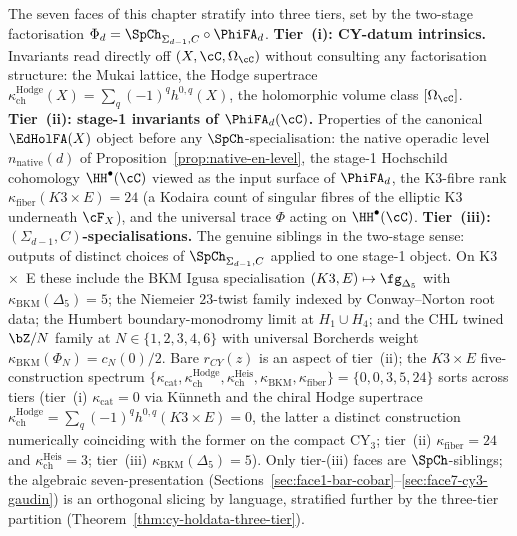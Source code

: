 \begin{remark}
\label{rem:cy-seven-face-three-tier-opener}
The seven faces of this chapter stratify into three tiers, set by the
two-stage factorisation $\Phi_d = \SpCh_{\Sigma_{d-1}, C} \circ \PhiFA_d$.
\textbf{Tier~(i): CY-datum intrinsics.} Invariants read directly off
$(X, \cC, \Omega_\cC)$ without consulting any factorisation structure:
the Mukai lattice, the Hodge supertrace $\kappa_{\mathrm{ch}}^{\mathrm{Hodge}}(X)
= \sum_q (-1)^q h^{0,q}(X)$, the holomorphic volume class $[\Omega_\cC]$.
\textbf{Tier~(ii): stage-1 invariants of $\PhiFA_d(\cC)$.} Properties of the
canonical $\EdHolFA(X)$ object before any $\SpCh$-specialisation: the
native operadic level $n_{\mathrm{native}}(d)$ of Proposition~\ref{prop:native-en-level},
the stage-1 Hochschild cohomology $\HH^\bullet(\cC)$ viewed as the input
surface of $\PhiFA_d$, the K3-fibre rank $\kappa_{\mathrm{fiber}}(K3 \times E) = 24$
(a Kodaira count of singular fibres of the elliptic K3 underneath $\cF_X$),
and the universal trace $\Phi$ acting on $\HH^\bullet(\cC)$.
\textbf{Tier~(iii): $(\Sigma_{d-1}, C)$-specialisations.} The genuine siblings
in the two-stage sense: outputs of distinct choices of $\SpCh_{\Sigma_{d-1}, C}$
applied to one stage-1 object. On K3~$\times$~E these include the BKM Igusa
specialisation $(K3, E) \mapsto \fg_{\Delta_5}$ with
$\kappa_{\mathrm{BKM}}(\Delta_5) = 5$; the Niemeier $23$-twist family indexed by
Conway--Norton root data; the Humbert boundary-monodromy limit at
$H_1 \cup H_4$; and the CHL twined $\bZ/N$ family at $N \in \{1,2,3,4,6\}$
with universal Borcherds weight $\kappa_{\mathrm{BKM}}(\Phi_N) = c_N(0)/2$.
Bare $r_{CY}(z)$ is an aspect of tier~(ii); the $K3 \times E$ five-construction spectrum
$\{\kappa_{\mathrm{cat}}, \kappa_{\mathrm{ch}}^{\mathrm{Hodge}},
\kappa_{\mathrm{ch}}^{\mathrm{Heis}}, \kappa_{\mathrm{BKM}},
\kappa_{\mathrm{fiber}}\} = \{0, 0, 3, 5, 24\}$ sorts across tiers
(tier~(i) $\kappa_{\mathrm{cat}} = 0$ via K\"unneth and the chiral
Hodge supertrace
$\kappa_{\mathrm{ch}}^{\mathrm{Hodge}} = \sum_q (-1)^q h^{0,q}(K3 \times E) = 0$,
the latter a distinct construction numerically coinciding with the
former on the compact CY$_3$; tier~(ii) $\kappa_{\mathrm{fiber}} = 24$
and $\kappa_{\mathrm{ch}}^{\mathrm{Heis}} = 3$; tier~(iii)
$\kappa_{\mathrm{BKM}}(\Delta_5) = 5$). Only tier-(iii) faces are
$\SpCh$-siblings; the algebraic seven-presentation
(Sections~\ref{sec:face1-bar-cobar}--\ref{sec:face7-cy3-gaudin})
is an orthogonal slicing by language, stratified further by the
three-tier partition (Theorem~\ref{thm:cy-holdata-three-tier}).
\end{remark}

